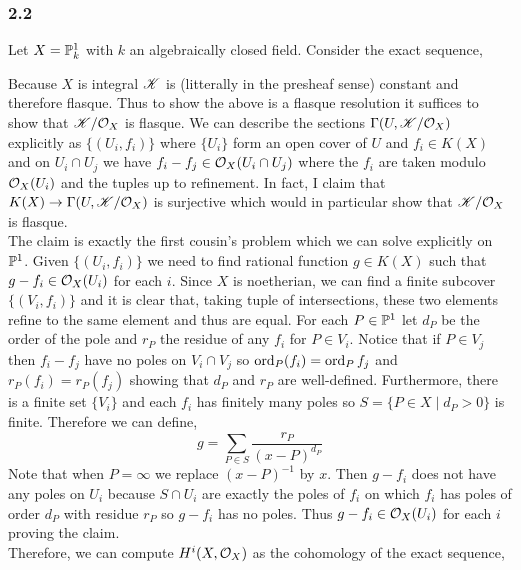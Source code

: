 \documentclass[12pt]{article}
\begin{document}
\subsubsection{2.2}

Let $X = \P^1_k$ with $k$ an algebraically closed field. Consider the exact sequence,
\begin{center}
\end{center}
Because $X$ is integral $\K$ is (litterally in the presheaf sense) constant and therefore flasque. Thus to show the above is a flasque resolution it suffices to show that $\K / \struct{X}$ is flasque. We can describe the sections $\Gamma(U, \K / \struct{X})$ explicitly as $\{ (U_i, f_i) \}$ where $\{ U_i \}$ form an open cover of $U$ and $f_i \in K(X)$ and on $U_i \cap U_j$ we have $f_i - f_j \in \struct{X}(U_i \cap U_j)$ where the $f_i$ are taken modulo $\struct{X}(U_i)$ and the tuples up to refinement. In fact, I claim that $K(X) \to \Gamma(U, \K/\struct{X})$ is surjective which would in particular show that $\K / \struct{X}$ is flasque.
\bigskip\\
The claim is exactly the first cousin's problem which we can solve explicitly on $\P^1$. Given $\{ (U_i, f_i) \}$ we need to find rational function $g \in K(X)$ such that $g - f_i \in \struct{X}(U_i)$ for each $i$. Since $X$ is noetherian, we can find a finite subcover $\{ (V_i, f_i) \}$ and it is clear that, taking tuple of intersections, these two elements refine to the same element and thus are equal. For each $P \in \P^1$ let $d_P$ be the order of the pole and $r_P$ the residue of any $f_i$ for $P \in V_i$. Notice that if $P \in V_j$ then $f_i - f_j$ have no poles on $V_i \cap V_j$ so $\ord_{P}(f_i) = \ord_P{f_j}$ and $r_P(f_i) = r_P(f_j)$ showing that $d_P$ and $r_P$ are well-defined. Furthermore, there is a finite set $\{ V_i \}$ and each $f_i$ has finitely many poles so $S = \{ P \in X \mid d_P > 0 \}$ is finite. Therefore we can define,
\[ g = \sum_{P \in S} \frac{r_P}{(x - P)^{d_P}} \]
Note that when $P = \infty$ we replace $(x - P)^{-1}$ by $x$. Then $g - f_i$ does not have any poles on $U_i$ because $S \cap U_i$ are exactly the poles of $f_i$ on which $f_i$ has poles of order $d_P$ with residue $r_P$ so $g - f_i$ has no poles. Thus $g - f_i \in \struct{X}(U_i)$ for each $i$ proving the claim.
\bigskip\\
Therefore, we can compute $H^i(X, \struct{X})$ as the cohomology of the exact sequence,
\end{document}
